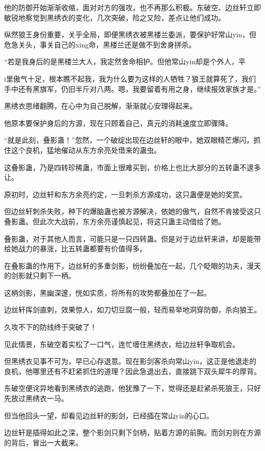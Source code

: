 \begin{this_body}
他的防御开始渐渐收缩，面对对方的强攻，也不再那么积极。东破空、边丝轩立即敏锐地察觉到黑绣衣的变化，几次突破，险之又险，差点让他们成功。

纵然狼王身份重要，关乎全局，即便黑绣衣被黑楼兰委派，要保护好常山yin，但危急关头，事关自己的xing命，黑楼兰还是做不到舍身拼杀。

“若是我身后的是黑楼兰大人，我定然舍命相护。但他常山yin却是个外人，平

i里傲气十足，根本瞧不起我，我为什么要为这样的人牺牲？狼王就算死了，我们手中还有黑旗军，仍旧半斤对八两。嗯，我要留着有用之身，继续报效家族才是。”

黑绣衣思绪翻腾，在心中为自己脱解，渐渐就心安理得起来。

他原本要保护身后的方源，现在只顾着自己，真元的消耗速度立即骤降。

“就是此刻，叠影蛊！”忽然，一个破绽出现在边丝轩的眼中，她双眼精芒爆闪，抓住这个良机，猛地催动从东方余亮处借来的蛊虫。

这叠影蛊，乃是四转珍稀蛊，市面上很难买到，价格上也比大部分的五转蛊不遑多让。

原初时，边丝轩和东方余亮约定，一旦刺杀方源成功，这只蛊便是她的奖赏。

但边丝轩刺杀失败，种下的爆脑蛊也被方源解决，依她的傲气，自然不肯接受这只叠影蛊。但此次大战前，东方余亮谨慎起见，将这只蛊主动借给了她。

叠影蛊，对于其他人而言，可能只是一只四转蛊。但是对于边丝轩来讲，却是能带给她战力的暴涨，比五转蛊都要有价值得多。

在叠影蛊的作用下，边丝轩的多重剑影，纷纷叠加在一起，几个眨眼的功夫，漫天的剑影就只剩下一柄。

这柄剑影，黑幽深邃，恍如实质，将所有的攻势都叠加在了一起。

边丝轩挥剑直刺，效果惊人，如刀切豆腐一般，轻而易举地洞穿防御，杀向狼王。

久攻不下的防线终于突破了！

见此情景，东破空着实松了一口气，连忙缠住黑绣衣，给边丝轩争取机会。

但黑绣衣见事不可为，早已心存退意。现在影剑客杀向常山yin，这正是他退走的良机，他哪里还有不赶紧抓住的道理？因此急退出去，直接跳下双头犀牛的厚背。

东破空便诧异地看到黑绣衣的逃跑，他犹豫了一下，觉得还是赶紧杀死狼王，只好先放过黑绣衣一马。

但当他回头一望，却看见边丝轩的影剑，已经插在常山yin的心口。

边丝轩是插得如此之深，整个影剑只剩下剑柄，贴着方源的前胸。而剑刃则在方源的背后，冒出一大截来。


\end{this_body}
